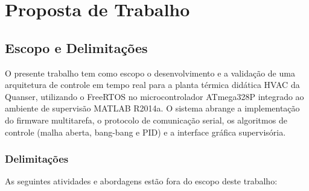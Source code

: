 \documentclass[repeatfields,xlists,xpacks,oneside]{ufrgscca}
\begin{document}
\chapter{Proposta de Trabalho}

\section{Escopo e Delimitações}

O presente trabalho tem como escopo o desenvolvimento e a
validação de uma arquitetura de controle em tempo real para
a planta térmica didática HVAC da Quanser, utilizando o
FreeRTOS no microcontrolador ATmega328P integrado ao
ambiente de supervisão MATLAB R2014a. O sistema abrange a
implementação do firmware multitarefa, o protocolo de
comunicação serial, os algoritmos de controle (malha aberta,
bang-bang e PID) e a interface gráfica supervisória.

\subsection{Delimitações}

As seguintes atividades e abordagens estão fora do escopo
deste trabalho:
\end{document}
